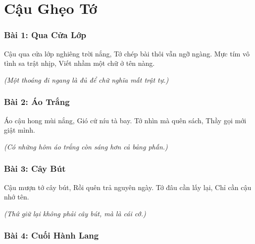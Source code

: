 \documentclass[14pt,a4paper,twoside]{extbook}
\begin{document}




\newpage
\tableofcontents
\newpage

\part{Cậu Ghẹo Tớ}

\section*{Bài 1: Qua Cửa Lớp}

Cậu qua cửa lớp nghiêng trời nắng,
Tớ chép bài thôi vẫn ngỡ ngàng.
Mực tím vô tình sa trật nhịp,
Viết nhầm một chữ ở tên nàng.

\vspace{1.5cm}\noindent
\textit{(Một thoáng đi ngang là đủ để chữ nghĩa mất trật tự.)}

\vspace{2cm}

\section*{Bài 2: Áo Trắng}

Áo cậu hong mùi nắng,
Gió cứ níu tà bay.
Tớ nhìn mà quên sách,
Thầy gọi mới giật mình.

\vspace{1.5cm}\noindent
\textit{(Có những hôm áo trắng còn sáng hơn cả bảng phấn.)}

\vspace{2cm}

\section*{Bài 3: Cây Bút}

Cậu mượn tớ cây bút,
Rồi quên trả nguyên ngày.
Tớ đâu cần lấy lại,
Chỉ cần cậu nhớ tên.

\vspace{1.5cm}\noindent
\textit{(Thứ giữ lại không phải cây bút, mà là cái cớ.)}

\vspace{2cm}

\section*{Bài 4: Cuối Hành Lang}
\end{document}
